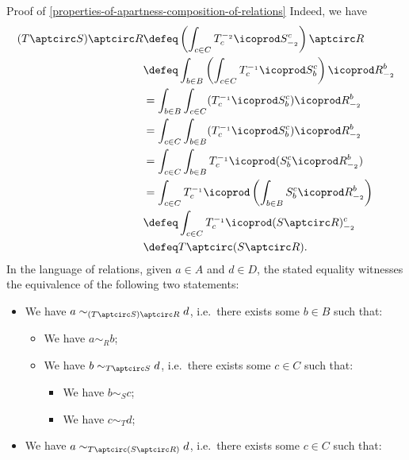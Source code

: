 \begin{Proof}{Proof of \cref{properties-of-apartness-composition-of-relations}}
    Indeed, we have
    \begin{align*}
        (T\aptcirc S)\aptcirc R &\defeq \left(\int_{c\in C}T^{-_{2}}_{c}\icoprod S^{c}_{-_{2}}\right)\aptcirc R\\
                                &\defeq \int_{b\in B}\left(\int_{c\in C}T^{-_{1}}_{c}\icoprod S^{c}_{b}\right)\icoprod R^{b}_{-_{2}}\\
                                &=      \int_{b\in B}\int_{c\in C}(T^{-_{1}}_{c}\icoprod S^{c}_{b})\icoprod R^{b}_{-_{2}}\\
                                &=      \int_{c\in C}\int_{b\in B}(T^{-_{1}}_{c}\icoprod S^{c}_{b})\icoprod R^{b}_{-_{2}}\\
                                &=      \int_{c\in C}\int_{b\in B}T^{-_{1}}_{c}\icoprod(S^{c}_{b}\icoprod R^{b}_{-_{2}})\\
                                &=      \int_{c\in C}T^{-_{1}}_{c}\icoprod\left(\int_{b\in B}S^{c}_{b}\icoprod R^{b}_{-_{2}}\right)\\
                                &\defeq \int_{c\in C}T^{-_{1}}_{c}\icoprod(S\aptcirc R)^{c}_{-_{2}}\\
                                &\defeq T\aptcirc(S\aptcirc R).
    \end{align*}
    In the language of relations, given $a\in A$ and $d\in D$, the stated equality witnesses the equivalence of the following two statements:
    \begin{itemize}
        \item We have $a\sim_{(T\aptcirc S)\aptcirc R}d$, i.e.\ there exists some $b\in B$ such that:
            \begin{itemize}
                \item We have $a\sim_{R}b$;
                \item We have $b\sim_{T\aptcirc S}d$, i.e.\ there exists some $c\in C$ such that:
                    \begin{itemize}
                        \item We have $b\sim_{S}c$;
                        \item We have $c\sim_{T}d$;
                    \end{itemize}
            \end{itemize}
        \item We have $a\sim_{T\aptcirc(S\aptcirc R)}d$, i.e.\ there exists some $c\in C$ such that:

\end{itemize}
\end{Proof}
